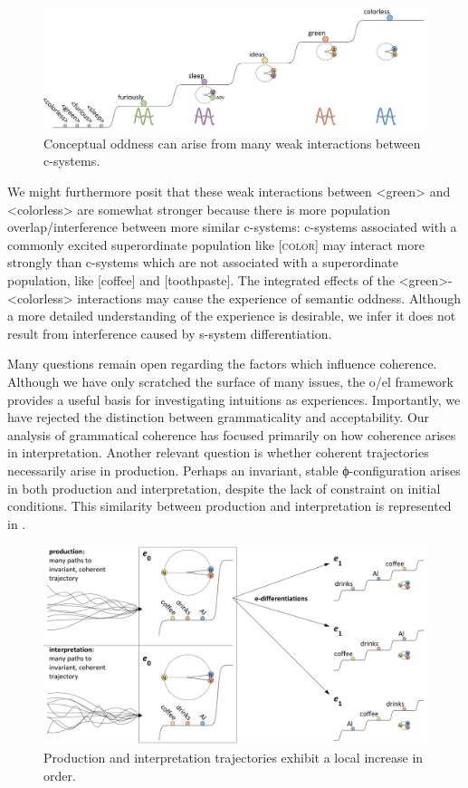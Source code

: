   
\begin{figure}
\includegraphics[width=\textwidth]{figures/Tilsen-img134.png}
\caption{Conceptual oddness can arise from many weak interactions between c-systems.}
\label{fig:6:15}
\end{figure}
 

  We might furthermore posit that these weak interactions between <green> and <colorless> are somewhat stronger because there is more population overlap/interference between more similar c-systems: c-systems associated with a commonly excited superordinate population like [\textsc{color}] may interact more strongly than c-systems which are not associated with a superordinate population, like [coffee] and [toothpaste]. The integrated effects of the <green>-<colorless> interactions may cause the experience of semantic oddness. Although a more detailed understanding of the experience is desirable, we infer it does not result from interference caused by s-system differentiation.

  Many questions remain open regarding the factors which influence coherence. Although we have only scratched the surface of many issues, the o/el framework provides a useful basis for investigating intuitions as experiences. Importantly, we have rejected the distinction between grammaticality and acceptability. Our analysis of grammatical coherence has focused primarily on how coherence arises in interpretation. Another relevant question is whether coherent trajectories necessarily arise in production. Perhaps an invariant, stable ϕ-configuration arises in both production and interpretation, despite the lack of constraint on initial conditions. This similarity between production and interpretation is represented in {}.

  
\begin{figure}
\includegraphics[width=\textwidth]{figures/Tilsen-img135.png}
\caption{Production and interpretation trajectories exhibit a local increase in order.}
\label{fig:6:16}
\end{figure}
 

